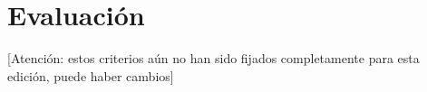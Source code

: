 \documentclass[a4paper,12pt]{article}
\begin{document}






\section{Evaluación}

[Atención: estos criterios aún no han sido fijados completamente para esta edición, puede haber cambios]
\end{document}
